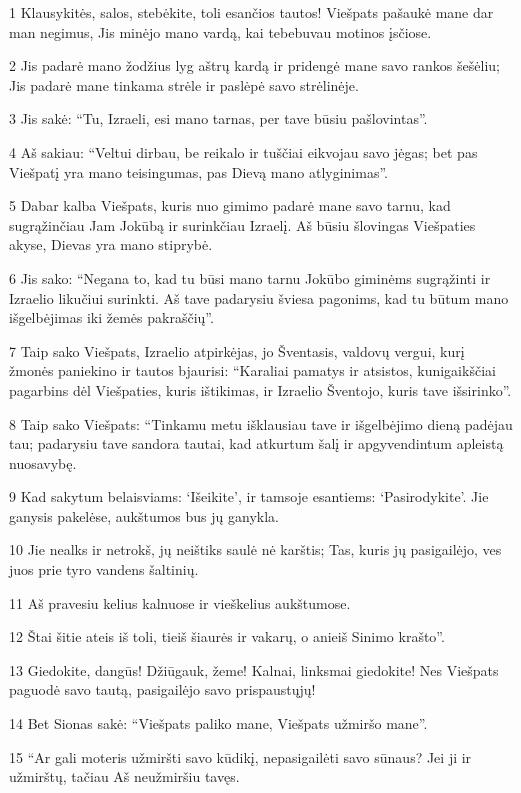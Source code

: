 \par 1 Klausykitės, salos, stebėkite, toli esančios tautos! Viešpats pašaukė mane dar man negimus, Jis minėjo mano vardą, kai tebebuvau motinos įsčiose. 
\par 2 Jis padarė mano žodžius lyg aštrų kardą ir pridengė mane savo rankos šešėliu; Jis padarė mane tinkama strėle ir paslėpė savo strėlinėje. 
\par 3 Jis sakė: “Tu, Izraeli, esi mano tarnas, per tave būsiu pašlovintas”. 
\par 4 Aš sakiau: “Veltui dirbau, be reikalo ir tuščiai eikvojau savo jėgas; bet pas Viešpatį yra mano teisingumas, pas Dievą mano atlyginimas”. 
\par 5 Dabar kalba Viešpats, kuris nuo gimimo padarė mane savo tarnu, kad sugrąžinčiau Jam Jokūbą ir surinkčiau Izraelį. Aš būsiu šlovingas Viešpaties akyse, Dievas yra mano stiprybė. 
\par 6 Jis sako: “Negana to, kad tu būsi mano tarnu Jokūbo giminėms sugrąžinti ir Izraelio likučiui surinkti. Aš tave padarysiu šviesa pagonims, kad tu būtum mano išgelbėjimas iki žemės pakraščių”. 
\par 7 Taip sako Viešpats, Izraelio atpirkėjas, jo Šventasis, valdovų vergui, kurį žmonės paniekino ir tautos bjaurisi: “Karaliai pamatys ir atsistos, kunigaikščiai pagarbins dėl Viešpaties, kuris ištikimas, ir Izraelio Šventojo, kuris tave išsirinko”. 
\par 8 Taip sako Viešpats: “Tinkamu metu išklausiau tave ir išgelbėjimo dieną padėjau tau; padarysiu tave sandora tautai, kad atkurtum šalį ir apgyvendintum apleistą nuosavybę. 
\par 9 Kad sakytum belaisviams: ‘Išeikite’, ir tamsoje esantiems: ‘Pasirodykite’. Jie ganysis pakelėse, aukštumos bus jų ganykla. 
\par 10 Jie nealks ir netrokš, jų neištiks saulė nė karštis; Tas, kuris jų pasigailėjo, ves juos prie tyro vandens šaltinių. 
\par 11 Aš pravesiu kelius kalnuose ir vieškelius aukštumose. 
\par 12 Štai šitie ateis iš toli, tie­iš šiaurės ir vakarų, o anie­iš Sinimo krašto”. 
\par 13 Giedokite, dangūs! Džiūgauk, žeme! Kalnai, linksmai giedokite! Nes Viešpats paguodė savo tautą, pasigailėjo savo prispaustųjų! 
\par 14 Bet Sionas sakė: “Viešpats paliko mane, Viešpats užmiršo mane”. 
\par 15 “Ar gali moteris užmiršti savo kūdikį, nepasigailėti savo sūnaus? Jei ji ir užmirštų, tačiau Aš neužmiršiu tavęs. 
